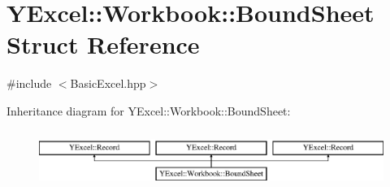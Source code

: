 \hypertarget{struct_y_excel_1_1_workbook_1_1_bound_sheet}{}\section{Y\+Excel\+:\+:Workbook\+:\+:Bound\+Sheet Struct Reference}
\label{struct_y_excel_1_1_workbook_1_1_bound_sheet}


{\ttfamily \#include $<$Basic\+Excel.\+hpp$>$}

Inheritance diagram for Y\+Excel\+:\+:Workbook\+:\+:Bound\+Sheet\+:\begin{figure}[H]
\begin{center}
\leavevmode
\includegraphics[height=1.904762cm]{struct_y_excel_1_1_workbook_1_1_bound_sheet}
\end{center}
\end{figure}
